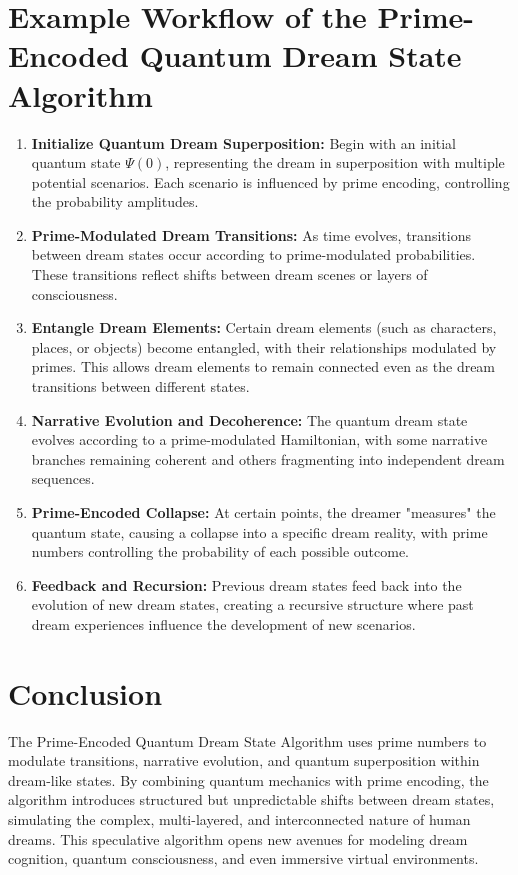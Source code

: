 \documentclass{article}
\theoremstyle{plain}
\begin{document}
\section{Example Workflow of the Prime-Encoded Quantum Dream State Algorithm}
\begin{enumerate}
    \item \textbf{Initialize Quantum Dream Superposition:} Begin with an initial quantum state $\Psi(0)$, representing the dream in superposition with multiple potential scenarios. Each scenario is influenced by prime encoding, controlling the probability amplitudes.
    \item \textbf{Prime-Modulated Dream Transitions:} As time evolves, transitions between dream states occur according to prime-modulated probabilities. These transitions reflect shifts between dream scenes or layers of consciousness.
    \item \textbf{Entangle Dream Elements:} Certain dream elements (such as characters, places, or objects) become entangled, with their relationships modulated by primes. This allows dream elements to remain connected even as the dream transitions between different states.
    \item \textbf{Narrative Evolution and Decoherence:} The quantum dream state evolves according to a prime-modulated Hamiltonian, with some narrative branches remaining coherent and others fragmenting into independent dream sequences.
    \item \textbf{Prime-Encoded Collapse:} At certain points, the dreamer "measures" the quantum state, causing a collapse into a specific dream reality, with prime numbers controlling the probability of each possible outcome.
    \item \textbf{Feedback and Recursion:} Previous dream states feed back into the evolution of new dream states, creating a recursive structure where past dream experiences influence the development of new scenarios.
\end{enumerate}

\section{Conclusion}
The Prime-Encoded Quantum Dream State Algorithm uses prime numbers to modulate transitions, narrative evolution, and quantum superposition within dream-like states. By combining quantum mechanics with prime encoding, the algorithm introduces structured but unpredictable shifts between dream states, simulating the complex, multi-layered, and interconnected nature of human dreams. This speculative algorithm opens new avenues for modeling dream cognition, quantum consciousness, and even immersive virtual environments.

\nocite{*}


\end{document}
